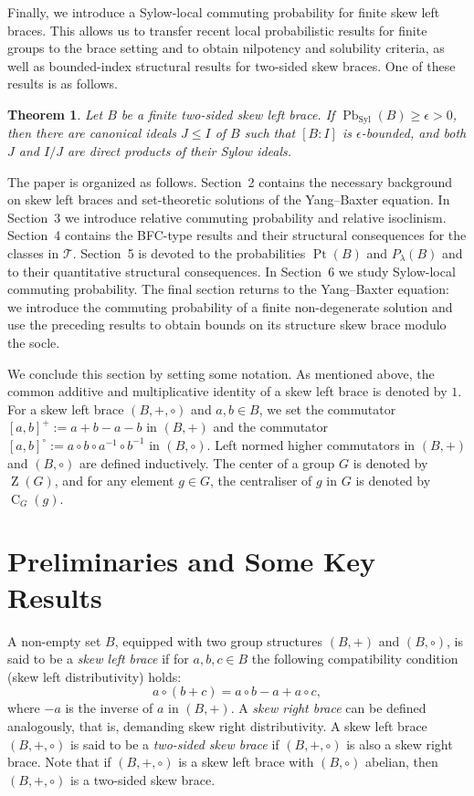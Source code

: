 \documentclass[11pt, oneside]{amsart}
\numberwithin{equation}{section}
\theoremstyle{plain}
\newtheorem{thm}[equation]{Theorem}
\theoremstyle{definition}
\newcommand{\C}{\operatorname{C} }
\newcommand{\Z}{\operatorname{Z} }
\newcommand{\Pb}{\operatorname{Pb} }
\newcommand{\Pt}{\operatorname{Pt} }
\newcommand{\Syl}{\operatorname{Syl} }
\begin{document}
Finally, we introduce a Sylow-local commuting probability for finite skew left braces. This allows us to transfer recent local probabilistic results for finite groups to the brace setting and to obtain nilpotency and solubility criteria, as well as bounded-index structural results for two-sided skew braces. One of these results is as follows.

\begin{thm} %
Let $B$ be a finite two-sided skew left brace. If $\Pb_{\Syl}(B)\geqslant\epsilon>0$,
then there are canonical ideals $J \leqslant I$ of $B$ such that $[B:I]$ is
$\epsilon$-bounded, and both $J$ and $I/J$ are direct products of their
Sylow ideals.
\end{thm}

The paper is organized as follows. Section~2 contains the necessary background on skew left braces and set-theoretic solutions of the Yang--Baxter equation. In Section~3 we introduce relative commuting probability and relative isoclinism. Section~4 contains the BFC-type results and their structural consequences for the classes in $\mathcal T$. Section~5 is devoted to the probabilities $\Pt(B)$ and $P_\lambda(B)$ and to their quantitative structural consequences. In Section~6 we study Sylow-local commuting probability. The final section returns to the Yang--Baxter equation: we introduce the commuting probability of a finite non-degenerate solution and use the preceding results to obtain bounds on its structure skew brace modulo the socle.

We conclude this section by setting some notation. As mentioned above, the common additive and multiplicative identity of a skew left brace is denoted by $1$. For a skew left brace $(B, +, \circ)$ and $a, b \in B$, we set the commutator $[a, b]^+ := a+b-a-b$ in $(B, +)$ and the commutator $[a, b]^{\circ} := a\circ b \circ a^{-1} \circ b^{-1}$ in $(B, \circ)$. Left normed higher commutators in $(B, +)$ and $(B, \circ)$ are defined inductively. The center of a group $G$ is denoted by $\Z(G)$, and for any element $g \in G$, the centraliser of $g$ in $G$ is denoted by $\C_G(g)$.





\section{Preliminaries and Some Key Results}

A non-empty set $B$, equipped with two group structures  $(B,+)$ and $(B, \circ)$, is  said to be a {\it skew left brace} if for $a, b, c \in B$ the following compatibility condition (skew left distributivity) holds:
 $$a \circ (b + c) = a \circ b - a + a \circ c,$$
 where $-a$ is the inverse of $a$ in $(B, +)$. A {\it skew right brace} can be defined analogously, that is, demanding  skew right distributivity.
 A skew left brace $(B, +, \circ)$ is said to be a {\it two-sided skew brace} if $(B, +, \circ)$ is also  a skew right brace.   Note that if $(B, +, \circ)$ is a skew left brace with $(B, \circ)$ abelian, then $(B, +, \circ)$ is a two-sided skew brace.  
 
\end{document}
